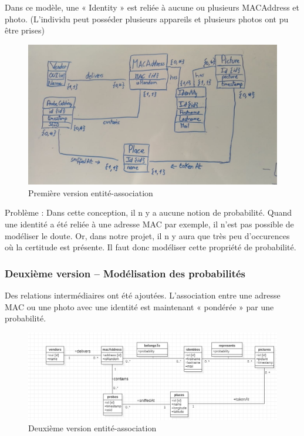 Dans ce modèle, une « Identity » est reliée à aucune ou plusieurs MACAddress et photo. (L’individu peut posséder
plusieurs appareils et plusieurs photos ont pu être prises)

\begin{figure}[H]
	\centering
	\includegraphics[width=12cm]{images/proto-1.png}
	\caption{Première version entité-association}
	\label{fig:arealytics}
\end{figure}

Problème : Dans cette conception, il n y a aucune notion de probabilité. Quand une identité a été reliée à une
adresse MAC par exemple, il n’est pas possible de modéliser le doute. Or, dans notre projet, il n y aura que très
peu d'occurences où la certitude est présente. Il faut donc modéliser cette propriété de probabilité.

\subsubsection{Deuxième version – Modélisation des probabilités}
Des relations intermédiaires ont été ajoutées. L’association entre une adresse MAC ou une photo avec une
identité est maintenant « pondérée » par une probabilité.

\begin{figure}[H]
	\centering
	\includegraphics[width=12cm]{images/proto-2.png}
	\caption{Deuxième version entité-association}
	\label{fig:model-ea-2}
\end{figure}

